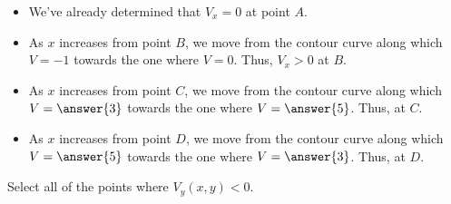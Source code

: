 \documentclass{ximera}
\begin{document}
\begin{exercise}
\begin{exercise}
\begin{hint}
\begin{itemize}
\item We've already determined that $V_x =0$ at point $A$.
\item 
As $x$ increases from point $B$, we move from the contour curve along which $V=-1$ towards the one where $V=0$.  Thus, $V_x>0$ at $B$.
\item As $x$ increases from point $C$, we move from the contour curve along which $V=\answer{3}$ towards the one where $V=\answer{5}$.  Thus,  at  $C$.
\item As $x$ increases from point $D$, we move from the contour curve along which $V=\answer{5}$ towards the one where $V=\answer{3}$.  Thus,  at  $D$.
\end{itemize}

\end{hint}
\end{exercise}  
\begin{exercise}
Select all of the points where $V_y(x,y)<0$.

\begin{selectAll}
\end{selectAll}

\end{exercise}  

\end{exercise}
\end{document}
